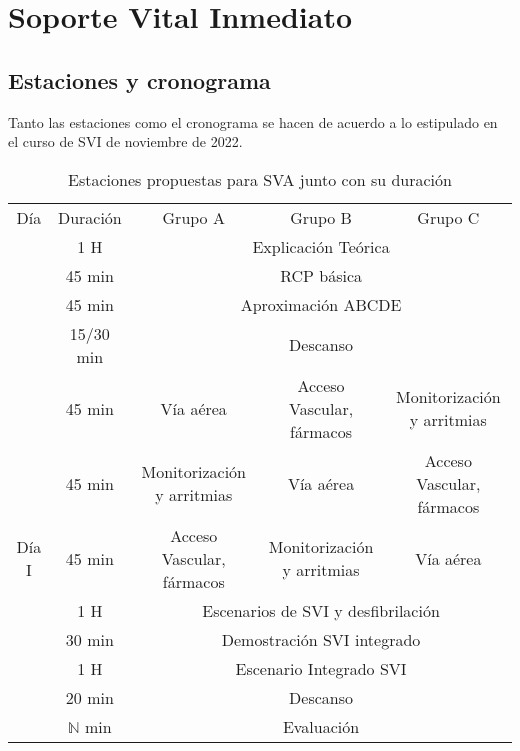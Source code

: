 \section{Soporte Vital Inmediato}
\subsection{Estaciones y cronograma}
Tanto las estaciones como el cronograma se hacen de acuerdo a lo estipulado en el curso de SVI de noviembre de 2022. 

\begin{table}[hptb]
    \centering
    \begin{tabular}{ccccc}
    \rowcolor[HTML]{333333} 
    {\color[HTML]{FFFFFF} Día} & {\color[HTML]{FFFFFF} Duración} & {\color[HTML]{FFFFFF} Grupo A} & {\color[HTML]{FFFFFF} Grupo B} & {\color[HTML]{FFFFFF} Grupo C} \\
     & 1 H & \multicolumn{3}{c}{Explicación Teórica} \\
     & \cellcolor[HTML]{D9D9D9}45 min & \multicolumn{3}{c}{\cellcolor[HTML]{D9D9D9}RCP básica} \\
     & 45 min & \multicolumn{3}{c}{Aproximación ABCDE} \\
     & \cellcolor[HTML]{D9D9D9}15/30 min & \multicolumn{3}{c}{\cellcolor[HTML]{D9D9D9}Descanso} \\
     & 45 min & Vía aérea & Acceso Vascular, fármacos & Monitorización y arritmias \\
     & \cellcolor[HTML]{D9D9D9}45 min & \cellcolor[HTML]{D9D9D9}Monitorización y arritmias & \cellcolor[HTML]{D9D9D9}Vía aérea & \cellcolor[HTML]{D9D9D9}Acceso Vascular,  fármacos \\
    \multirow{-7}{*}{Día I} & 45 min & Acceso Vascular, fármacos & Monitorización y arritmias & Vía aérea \\ \hline
    \rowcolor[HTML]{D9D9D9} 
    \cellcolor[HTML]{D9D9D9} & 1 H & \multicolumn{3}{c}{\cellcolor[HTML]{D9D9D9}Escenarios de SVI y desfibrilación} \\
    \cellcolor[HTML]{D9D9D9} & 30 min & \multicolumn{3}{c}{Demostración SVI integrado} \\
    \rowcolor[HTML]{D9D9D9} 
    \cellcolor[HTML]{D9D9D9} & 1 H & \multicolumn{3}{c}{\cellcolor[HTML]{D9D9D9}Escenario Integrado SVI} \\
    \cellcolor[HTML]{D9D9D9} & 20 min & \multicolumn{3}{c}{Descanso} \\
    \rowcolor[HTML]{D9D9D9} 
    \multirow{-5}{*}{\cellcolor[HTML]{D9D9D9}Día II} & $\mathbb{N}$ min & \multicolumn{3}{c}{\cellcolor[HTML]{D9D9D9}Evaluación} \\ \hline
    \end{tabular}
    \caption{Estaciones propuestas para SVA junto con su duración}
    \label{tab:Brusilov:SVI:Estaciones}
\end{table}

